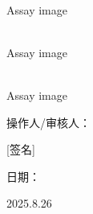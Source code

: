 \documentclass[UTF8,10pt,a4paper,fontset=fandol]{ctexart}
\newcommand{\fieldvalue}[1]{#1}
\newcommand{\handwritten}[1]{#1}
\begin{document}
\begin{center}
\setlength{\fboxsep}{0pt}
\begin{minipage}[t]{0.42\textwidth}
\centering
\fbox{\rule{0pt}{3.0cm}\rule{0.95\linewidth}{0pt}}\\[-0.2em]
\small Assay image
\end{minipage}
\hfill
\begin{minipage}[t]{0.42\textwidth}
\centering
\fbox{\rule{0pt}{3.0cm}\rule{0.95\linewidth}{0pt}}\\[-0.2em]
\small Assay image
\end{minipage}

\vspace{1em}

\begin{minipage}[t]{0.42\textwidth}
\centering
\fbox{\rule{0pt}{3.0cm}\rule{0.95\linewidth}{0pt}}\\[-0.2em]
\small Assay image
\end{minipage}
\end{center}

\vfill

\noindent 操作人/审核人：

\handwritten{[签名]}

\hfill 日期：

\fieldvalue{\handwritten{2025.8.26}}
\end{document}
